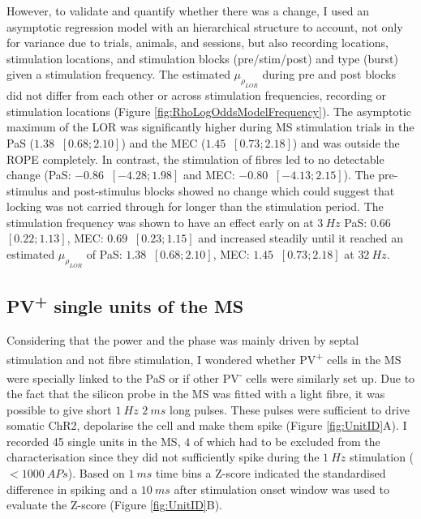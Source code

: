 \documentclass[
  12pt,
  a4paper,
  openany]{book}
\begin{document}
However, to validate and quantify whether there was a change, I used an asymptotic regression model with an hierarchical structure to account, not only for variance due to trials, animals, and sessions, but also recording locations, stimulation locations, and stimulation blocks (pre/stim/post) and type (burst) given a stimulation frequency. The estimated \(\mu_{\rho_{LOR}}\) during pre and post blocks did not differ from each other or across stimulation frequencies, recording or stimulation locations (Figure \ref{fig:RhoLogOddsModelFrequency}). The asymptotic maximum of the LOR was significantly higher during MS stimulation trials in the PaS (\(1.38\ \) \([0.68; 2.10]\)) and the MEC (\(1.45\ \) \([0.73; 2.18]\)) and was outside the ROPE completely. In contrast, the stimulation of fibres led to no detectable change (PaS: \(-0.86\ \) \([-4.28; 1.98]\) and MEC: \(-0.80\ \) \([-4.13; 2.15]\)). The pre-stimulus and post-stimulus blocks showed no change which could suggest that locking was not carried through for longer than the stimulation period. The stimulation frequency was shown to have an effect early on at \(3\ Hz\) PaS: \(0.66\ \) \([0.22; 1.13]\), MEC: \(0.69\ \) \([0.23; 1.15]\) and increased steadily until it reached an estimated \(\mu_{\rho_{LOR}}\) of PaS: \(1.38\ \) \([0.68; 2.10]\), MEC: \(1.45\ \) \([0.73; 2.18]\) at \(32\ Hz\).

\FloatBarrier

\hypertarget{pv-single-units-of-the-ms}{%
\subsection{\texorpdfstring{PV\textsuperscript{+} single units of the MS}{PV+ single units of the MS}}\label{pv-single-units-of-the-ms}}

Considering that the power and the phase was mainly driven by septal stimulation and not fibre stimulation, I wondered whether PV\textsuperscript{+} cells in the MS were specially linked to the PaS or if other PV\textsuperscript{-} cells were similarly set up. Due to the fact that the silicon probe in the MS was fitted with a light fibre, it was possible to give short \(1\ Hz\) \(2\ ms\) long pulses. These pulses were sufficient to drive somatic ChR2, depolarise the cell and make them spike (Figure \ref{fig:UnitID}A). I recorded 45 single units in the MS, \(4\) of which had to be excluded from the characterisation since they did not sufficiently spike during the \(1\ Hz\) stimulation (\(<1000\ APs\)). Based on \(1\ ms\) time bins a Z-score indicated the standardised difference in spiking and a \(10\ ms\) after stimulation onset window was used to evaluate the Z-score (Figure \ref{fig:UnitID}B).
\end{document}
